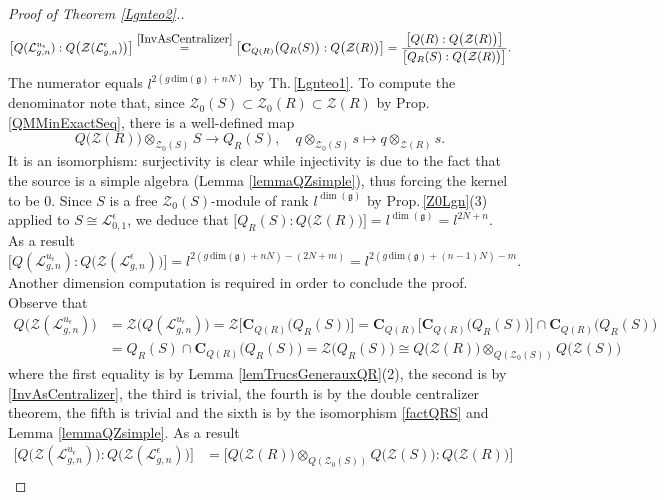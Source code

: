\documentclass[11pt]{amsart}
\newcommand{\e}{\epsilon}
\newcommand{\Ll}{\mathcal{L}}
\begin{document}
\begin{proof}[Proof of Theorem \ref{Lgnteo2}.]
\[ \bigl[ Q(\Ll_{g,n}^{u_\e}) : Q\bigl( \mathcal{Z}(\Ll_{g,n}^{\e}) \bigr) \bigr] \overset{\eqref{InvAsCentralizer}}{=} \bigl[ \mathbf{C}_{Q(R)}\bigl( Q_R(S) \bigr) : Q\bigl( \mathcal{Z}(R) \bigr) \bigr]  = \frac{\bigl[ Q(R) : Q\bigl( \mathcal{Z}(R) \bigr) \bigr]}{\bigl[ Q_R(S) : Q\bigl( \mathcal{Z}(R) \bigr) \bigr]}. \]
The numerator equals $l^{2(g\,\mathrm{dim}(\mathfrak{g})+nN)}$ by Th.\,\ref{Lgnteo1}. To compute the denominator note that, since $\mathcal{Z}_0(S) \subset \mathcal{Z}_0(R) \subset \mathcal{Z}(R)$ by Prop.\,\ref{QMMinExactSeq}, there is a well-defined map
\begin{equation}\label{factQRS}
Q\bigl( \mathcal{Z}(R) \bigr) \otimes_{\mathcal{Z}_0(S)} S \to Q_R(S), \quad q \otimes_{\mathcal{Z}_0(S)} s \mapsto q \otimes_{\mathcal{Z}(R)} s.
\end{equation}
It is an isomorphism: surjectivity is clear while injectivity is due to the fact that the source is a simple algebra (Lemma \ref{lemmaQZsimple}), thus forcing the kernel to be $0$. Since $S$ is a free $\mathcal{Z}_0(S)$-module of rank $l^{\dim(\mathfrak{g})}$ by Prop.\,\ref{Z0Lgn}(3) applied to $S \cong \mathcal{L}_{0,1}^\e$, we deduce that $\bigl[ Q_R(S) : Q\bigl( \mathcal{Z}(R) \bigr) \bigr] = l^{\dim(\mathfrak{g})} = l^{2N+n}$.
As a result
\[ \bigl[ Q(\Ll_{g,n}^{u_\e}) : Q\bigl( \mathcal{Z}(\Ll_{g,n}^{\e}) \bigr) \bigr] = l^{2(g\,\mathrm{dim}(\mathfrak{g})+nN) - (2N+m)}= l^{2(g\,\mathrm{dim}(\mathfrak{g})+(n-1)N)-m}. \]
Another dimension computation is required in order to conclude the proof. Observe that
\begin{align*}
Q\bigl( \mathcal{Z}(\mathcal{L}_{g,n}^{u_\e}) \bigr) &= \mathcal{Z}\bigl( Q(\mathcal{L}_{g,n}^{u_\e}) \bigr)  = \mathcal{Z}\bigl[ \mathbf{C}_{Q(R)}\bigl( Q_R(S) \bigr) \bigr] = \mathbf{C}_{Q(R)}\bigl[ \mathbf{C}_{Q(R)}\bigl( Q_R(S) \bigr) \bigr] \cap \mathbf{C}_{Q(R)}\bigl( Q_R(S) \bigr)\\
&=Q_R(S) \cap \mathbf{C}_{Q(R)}\bigl( Q_R(S) \bigr) = \mathcal{Z}\bigl( Q_R(S) \bigr) \cong Q\bigl( \mathcal{Z}(R) \bigr) \otimes_{Q(\mathcal{Z}_0(S))} Q\bigl(\mathcal{Z}(S)\bigr)
\end{align*}
where the first equality is by Lemma \ref{lemTrucsGenerauxQR}(2), the second is by \eqref{InvAsCentralizer}, the third is trivial, the fourth is by the double centralizer theorem, the fifth is trivial and the sixth is by the isomorphism \eqref{factQRS} and Lemma \ref{lemmaQZsimple}. As a result
\begin{align*}
\bigl[ Q\bigl( \mathcal{Z}(\mathcal{L}_{g,n}^{u_\e}) \bigr) : Q\bigl( \mathcal{Z}(\mathcal{L}_{g,n}^{\e}) \bigr) \bigr] &= \bigl[ Q\bigl( \mathcal{Z}(R) \bigr) \otimes_{Q(\mathcal{Z}_0(S))} Q\bigl(\mathcal{Z}(S)\bigr) : Q\bigl( \mathcal{Z}(R) \bigr) \bigr]\\

\end{align*}
\end{proof}
\end{document}
